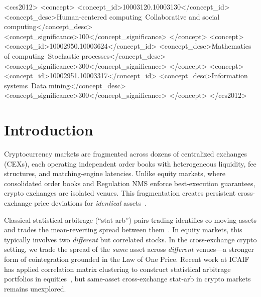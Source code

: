 \documentclass[sigconf,nonacm=false]{acmart}
\begin{document}
\begin{CCSXML}
<ccs2012>
  <concept>
    <concept_id>10003120.10003130</concept_id>
    <concept_desc>Human-centered computing~Collaborative and social computing</concept_desc>
    <concept_significance>100</concept_significance>
  </concept>
  <concept>
    <concept_id>10002950.10003624</concept_id>
    <concept_desc>Mathematics of computing~Stochastic processes</concept_desc>
    <concept_significance>300</concept_significance>
  </concept>
  <concept>
    <concept_id>10002951.10003317</concept_id>
    <concept_desc>Information systems~Data mining</concept_desc>
    <concept_significance>300</concept_significance>
  </concept>
</ccs2012>
\end{CCSXML}



\maketitle

\section{Introduction}\label{sec:intro}

Cryptocurrency markets are fragmented across dozens of centralized exchanges (CEXs), each operating independent order books with heterogeneous liquidity, fee structures, and matching-engine latencies. Unlike equity markets, where consolidated order books and Regulation NMS enforce best-execution guarantees, crypto exchanges are isolated venues. This fragmentation creates persistent cross-exchange price deviations for \emph{identical} assets~\cite{makarov2020trading}.

Classical statistical arbitrage (``stat-arb'') pairs trading identifies co-moving assets and trades the mean-reverting spread between them~\cite{krauss2017statistical}. In equity markets, this typically involves two \emph{different} but correlated stocks. In the cross-exchange crypto setting, we trade the spread of the \emph{same} asset across \emph{different} venues---a stronger form of cointegration grounded in the Law of One Price. Recent work at ICAIF has applied correlation matrix clustering to construct statistical arbitrage portfolios in equities~\cite{jin2023correlation}, but same-asset cross-exchange stat-arb in crypto markets remains unexplored.
\end{document}
